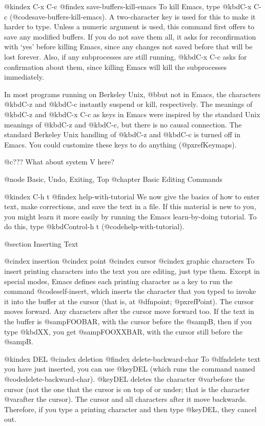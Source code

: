 {{@kindex C-x C-c
@findex save-buffers-kill-emacs
  To kill Emacs, type @kbd{C-x C-c} (@code{save-buffers-kill-emacs}).  A
two-character key is used for this to make it harder to type.  Unless a
numeric argument is used, this command first offers to save any modified
buffers.  If you do not save them all, it asks for reconfirmation with
`yes' before killing Emacs, since any changes not saved before that will be
lost forever.  Also, if any subprocesses are still running, @kbd{C-x C-c}
asks for confirmation about them, since killing Emacs will kill the
subprocesses immediately.

  In most programs running on Berkeley Unix, @b{but not in Emacs}, the
characters @kbd{C-z} and @kbd{C-c} instantly suspend or kill, respectively.
The meanings of @kbd{C-z} and @kbd{C-x C-c} as keys in Emacs were inspired
by the standard Unix meanings of @kbd{C-z} and @kbd{C-c}, but there is no
causal connection.  The standard Berkeley Unix handling of @kbd{C-z} and
@kbd{C-c} is turned off in Emacs.  You could customize these keys to do
anything (@pxref{Keymaps}).

@c??? What about system V here?

@node Basic, Undo, Exiting, Top
@chapter Basic Editing Commands

@kindex C-h t
@findex help-with-tutorial
  We now give the basics of how to enter text, make corrections, and
save the text in a file.  If this material is new to you, you might
learn it more easily by running the Emacs learn-by-doing tutorial.  To
do this, type @kbd{Control-h t} (@code{help-with-tutorial}).

@section Inserting Text

@cindex insertion
@cindex point
@cindex cursor
@cindex graphic characters
  To insert printing characters into the text you are editing, just
type them.  Except in special modes, Emacs defines each printing
character as a key to run the command @code{self-insert}, which inserts
the character that you typed to invoke it into the buffer at the
cursor (that is, at @dfn{point}; @pxref{Point}).  The cursor moves
forward.  Any characters after the cursor move forward too.  If the
text in the buffer is @samp{FOOBAR}, with the cursor before the
@samp{B}, then if you type @kbd{XX}, you get @samp{FOOXXBAR}, with the
cursor still before the @samp{B}.

@kindex DEL
@cindex deletion
@findex delete-backward-char
   To @dfn{delete} text you have just inserted, you can use @key{DEL}
(which runs the command named @code{delete-backward-char}).  @key{DEL}
deletes the character @var{before} the cursor (not the one that the cursor
is on top of or under; that is the character @var{after} the cursor).  The
cursor and all characters after it move backwards.  Therefore, if you type
a printing character and then type @key{DEL}, they cancel out.

}}
